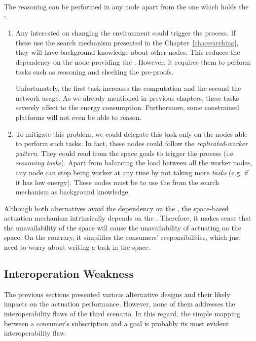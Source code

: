 The reasoning can be performed in any node apart from the one which holds the \Space{}:

\begin{enumerate}
  \item Any \consumer{} interested on changing the environment could trigger the process.
	If these \consumers{} use the search mechanism presented in the Chapter~\ref{cha:searching}, they will have background knowledge about other nodes.
	This reduces the dependency on the node providing the \coordspace{}.
	However, it requires them to perform tasks such as reasoning and checking the pre-proofs.
	
	Unfortunately, the first task increases the computation and the second the network usage.
	As we already mentioned in previous chapters, these tasks severely affect to the energy consumption.
	Furthermore, some constrained platforms will not even be able to reason.
	
  \item To mitigate this problem, we could delegate this task only on the nodes able to perform such tasks.
	In fact, these nodes could follow the \emph{replicated-worker pattern}.
	They could read from the space goals to trigger the process (i.e. \emph{reasoning tasks}).
	Apart from balancing the load between all the worker nodes, any node can stop being worker at any time by not taking more \emph{tasks} (e.g. if it has low energy).
	These nodes must be \consumers{} to use the \clues{} from the search mechanism as background knowledge.
\end{enumerate}


Although both alternatives avoid the dependency on the \Space{}, the space-based actuation mechanism intrinsically depends on the \Space{}.
Therefore, it makes sense that the unavailability of the space will cause the unavailability of actuating on the space.
On the contrary, it simplifies the consumers' responsibilities, which just need to worry about writing a task in the space.



\subsection{Interoperation Weakness}

The previous sections presented various alternative designs and their likely impacts on the actuation performance.
However, none of them addresses the interoperability flaws of the third scenario.
In this regard, the simple mapping between a consumer's subscription and a goal is probably its most evident interoperability flaw.


